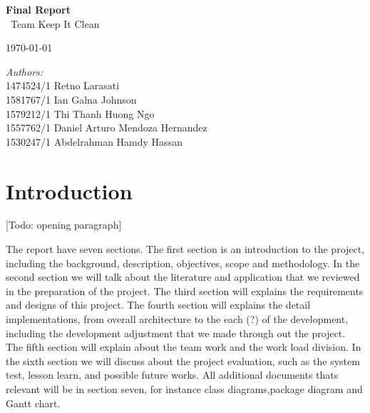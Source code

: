 \documentclass[11pt]{article}
\begin{document}
	\begin{titlepage}
	\center
	\newcommand{\HRule}{\rule{\linewidth}{0.5mm}} 

        {\huge \bfseries Final Report}\\[0.4cm]
        	\ Team Keep It Clean
        
        {\large \today}\\[10cm] 
        
        \begin{minipage}{0.4\textwidth}
        		\emph{Authors:}\\
        			1474524/1	Retno Larasati\\
                    1581767/1	Ian Galna Johnson\\	
                    1579212/1	Thi Thanh Huong Ngo\\
                    1557762/1	Daniel Arturo Mendoza Hernandez\\
                    1530247/1	Abdelrahman Hamdy Hassan\\
        \end{minipage}

\end{titlepage}
\tableofcontents
\newpage
	
\section{Introduction}

[Todo: opening paragraph]

The report have seven sections. The first section is an introduction to the project, including the background, description, objectives, scope and methodology. In the second section we will talk about the literature and application that we reviewed in the preparation of the project. The third section will explains the requirements and designs of this project. The fourth section will explains the detail implementations, from overall architecture to the each (?) of the development, including the development adjustment that we made through out the project. The fifth section will explain about the team work and the work load division. In the sixth section we will discuss about the project evaluation, such as the system test, lesson learn, and possible future works. All additional documents thats relevant will be in section seven, for instance class diagrams,package diagram and Gantt chart. 
\end{document}
